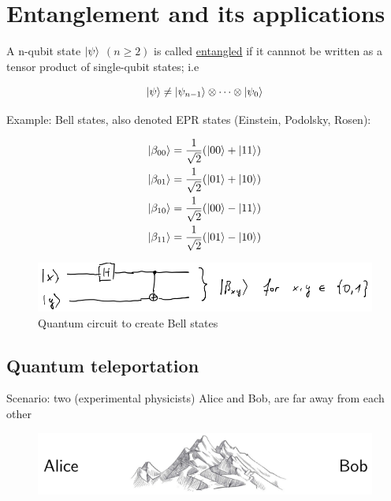 \section{Entanglement and its applications}

A n-qubit state $\lvert\psi\rangle$ $(n \geq 2)$ is called \underline{entangled} if it cannnot be written 
as a tensor product of single-qubit states; i.e

\begin{equation}
    \lvert\psi\rangle \neq \lvert\psi_{n-1}\rangle \otimes \cdots \otimes \lvert\psi_0\rangle
\end{equation}

Example: Bell states, also denoted EPR states (Einstein, Podolsky, Rosen):

\begin{align*}
    \lvert\beta_{00}\rangle &= \frac{1}{\sqrt{2}} (\lvert00\rangle + \lvert11\rangle) \\
    \lvert\beta_{01}\rangle &= \frac{1}{\sqrt{2}} (\lvert01\rangle + \lvert10\rangle) \\
    \lvert\beta_{10}\rangle &= \frac{1}{\sqrt{2}} (\lvert00\rangle - \lvert11\rangle) \\
    \lvert\beta_{11}\rangle &= \frac{1}{\sqrt{2}} (\lvert01\rangle - \lvert10\rangle) \\
\end{align*}

\begin{figure}[H]
    \centering
    \includegraphics[scale=0.5]{chapters/res/circuit-bell-states.png}
    \caption{Quantum circuit to create Bell states}
\end{figure}


\subsection{Quantum teleportation}

Scenario: two (experimental physicists) Alice and Bob, are far away from each other

\begin{figure}[H]
    \centering
    \includegraphics[scale=0.5]{chapters/res/alice-bob-mountains.png}
\end{figure}

